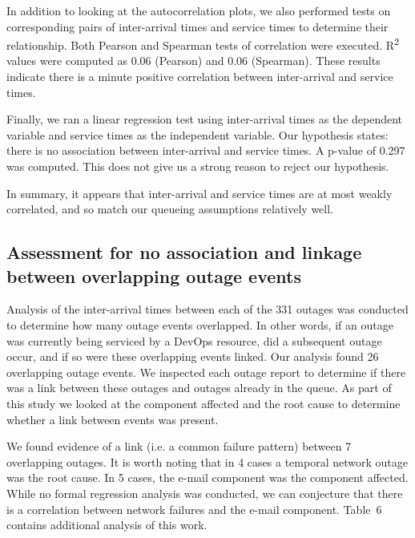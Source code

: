 \documentclass[5p]{elsarticle}
\begin{document}
In addition to looking at the autocorrelation plots, we also performed tests on corresponding pairs of inter-arrival times and service times to determine their relationship. Both Pearson and Spearman tests of correlation were executed. R\textsuperscript{2} values were computed as 0.06 (Pearson) and 0.06 (Spearman). These results indicate there is a minute positive correlation between inter-arrival and service times.

Finally, we ran a linear regression test using inter-arrival times as the dependent variable and service times as the independent variable. Our hypothesis states: there is no association between inter-arrival and service times. A p-value of 0.297 was computed. This does not give us a strong reason to reject our hypothesis.

In summary, it appears that inter-arrival and service times are at most weakly correlated, and so match our queueing assumptions relatively well.

\subsection{Assessment for no association and linkage between overlapping outage events}

Analysis of the inter-arrival times between each of the 331 outages was conducted to determine how many outage events overlapped. In other words, if an outage was currently being serviced by a DevOps resource, did a subsequent outage occur, and if so were these overlapping events linked. Our analysis found 26 overlapping outage events. We inspected each outage report to determine if there was a link between these outages and outages already in the queue. As part of this study we looked at the component affected and the root cause to determine whether a link between events was present. 

We found evidence of a link (i.e. a common failure pattern) between 7 overlapping outages. It is worth noting that in 4 cases a temporal network outage was the root cause. In 5 cases, the e-mail component was the component affected. While no formal regression analysis was conducted, we can conjecture that there is a correlation between network failures and the e-mail component. Table~6 contains additional analysis of this work.
\end{document}
